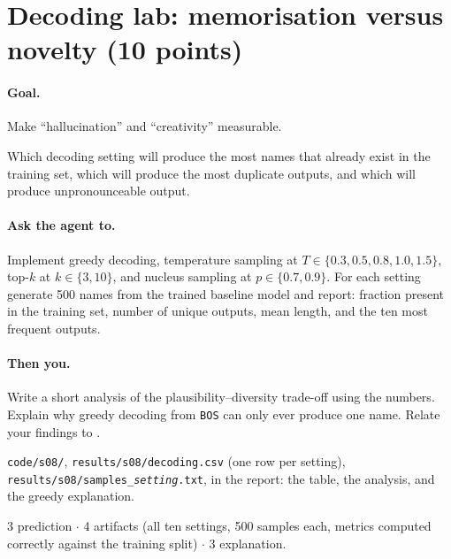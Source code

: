 \documentclass[11pt,letterpaper]{article}
\newcommand{\agent}[1]{\paragraph{Ask the agent to.} #1}
\newcommand{\you}[1]{\paragraph{Then you.} #1}
\newcommand{\goal}[1]{\paragraph{Goal.} #1}
\begin{document}
\section{Decoding lab: memorisation versus novelty \hfill (10 points)}
\goal{Make ``hallucination'' and ``creativity'' measurable.}
\begin{predict}
Which decoding setting will produce the most names that already exist in the training set, which will produce the most duplicate outputs, and which will produce unpronounceable output.
\end{predict}
\agent{Implement greedy decoding, temperature sampling at $T\in\{0.3, 0.5, 0.8, 1.0, 1.5\}$, top-$k$ at $k\in\{3, 10\}$, and nucleus sampling at $p\in\{0.7, 0.9\}$. For each setting generate 500 names from the trained baseline model and report: fraction present in the training set, number of unique outputs, mean length, and the ten most frequent outputs.}
\you{Write a short analysis of the plausibility--diversity trade-off using the numbers. Explain why greedy decoding from \texttt{BOS} can only ever produce one name. Relate your findings to \textcite{holtzman2020nucleus}.}
\begin{deliver}
\texttt{code/s08/}, \texttt{results/s08/decoding.csv} (one row per setting), \texttt{results/s08/samples\_\textit{setting}.txt}, in the report: the table, the analysis, and the greedy explanation.
\end{deliver}
\begin{rubric}3 prediction $\cdot$ 4 artifacts (all ten settings, 500 samples each, metrics computed correctly against the training split) $\cdot$ 3 explanation.\end{rubric}

\end{document}
